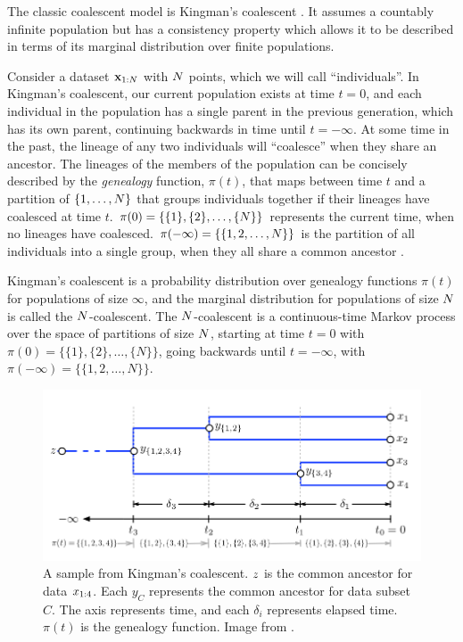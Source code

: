 The classic coalescent model is
Kingman's coalescent \citep{Kingman1982}.
It assumes a countably infinite population
but has a consistency property
which allows it to be described
in terms of its marginal distribution
over finite populations.

Consider a dataset $\mathbf{x}_{1:N}$ with $N$ points, 
which we will call ``individuals''.
In Kingman's coalescent,
our current population exists at time $t = 0$,
and each individual in the population has a single
parent in the previous generation, which has its own parent,
continuing backwards in time until
$t = -\infty$. 
At some time in the past,
the lineage of any two individuals will ``coalesce''
when they share an ancestor.
The lineages of the members of the population
can be concisely described
by the
\emph{genealogy} function, $\pi(t)$,
that maps between time $t$
and a partition of $\{1, \ldots, N\}$
that groups individuals together
if their lineages have coalesced at time $t$.
$\pi(0) = \{\{1\}, \{2\},\ldots,\{N\}\}$
represents
the current time, when no
lineages have coalesced.
$\pi(-\infty) = \{\{1, 2, \ldots, N\}\}$
is the partition of all
individuals into a single group,
when they all share a common ancestor \citep{Teh2008}.

Kingman's coalescent
is a probability distribution
over genealogy functions $\pi(t)$
for populations of size $\infty$,
and the marginal distribution for
populations of size $N$ is called the $N$-coalescent.
The $N$-coalescent
is a continuous-time
Markov process
over the space of partitions
of size $N$,
starting at time $t = 0$ with
$\pi(0) = \{\{1\}, \{2\},\ldots,\{N\}\}$,
going backwards until  $t = -\infty$,
with
$\pi(-\infty) = \{\{1, 2, \ldots, N\}\}$.

\begin{figure}[H]
  \centering
  \includegraphics[width=\textwidth]{img/trees/coalescent}
  \caption{A sample from Kingman's coalescent. $z$ is
    the common ancestor for data $x_{1:4}$. Each $y_C$
  represents the common ancestor for data subset $C$. 
  The axis represents time, and each $\delta_i$ represents elapsed time. 
  $\pi(t)$ is
  the genealogy function. Image from \citet{Teh2008}.}
\label{fig:coalescent}
\end{figure}

